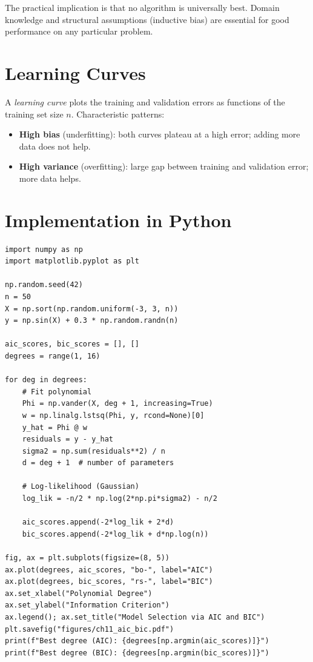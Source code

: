 \begin{remark}
The practical implication is that no algorithm is universally best. Domain knowledge and structural assumptions (inductive bias) are essential for good performance on any particular problem.
\end{remark}

\section{Learning Curves}

\begin{definition}
A \emph{learning curve} plots the training and validation errors as functions of the training set size $n$. Characteristic patterns:
\begin{itemize}
  \item \textbf{High bias} (underfitting): both curves plateau at a high error; adding more data does not help.
  \item \textbf{High variance} (overfitting): large gap between training and validation error; more data helps.
\end{itemize}
\end{definition}

\section{Implementation in Python}

\begin{codeblock}[title=\textbf{AIC/BIC for Polynomial Regression}]
\begin{verbatim}
import numpy as np
import matplotlib.pyplot as plt

np.random.seed(42)
n = 50
X = np.sort(np.random.uniform(-3, 3, n))
y = np.sin(X) + 0.3 * np.random.randn(n)

aic_scores, bic_scores = [], []
degrees = range(1, 16)

for deg in degrees:
    # Fit polynomial
    Phi = np.vander(X, deg + 1, increasing=True)
    w = np.linalg.lstsq(Phi, y, rcond=None)[0]
    y_hat = Phi @ w
    residuals = y - y_hat
    sigma2 = np.sum(residuals**2) / n
    d = deg + 1  # number of parameters

    # Log-likelihood (Gaussian)
    log_lik = -n/2 * np.log(2*np.pi*sigma2) - n/2

    aic_scores.append(-2*log_lik + 2*d)
    bic_scores.append(-2*log_lik + d*np.log(n))

fig, ax = plt.subplots(figsize=(8, 5))
ax.plot(degrees, aic_scores, "bo-", label="AIC")
ax.plot(degrees, bic_scores, "rs-", label="BIC")
ax.set_xlabel("Polynomial Degree")
ax.set_ylabel("Information Criterion")
ax.legend(); ax.set_title("Model Selection via AIC and BIC")
plt.savefig("figures/ch11_aic_bic.pdf")
print(f"Best degree (AIC): {degrees[np.argmin(aic_scores)]}")
print(f"Best degree (BIC): {degrees[np.argmin(bic_scores)]}")
\end{verbatim}
\end{codeblock}

